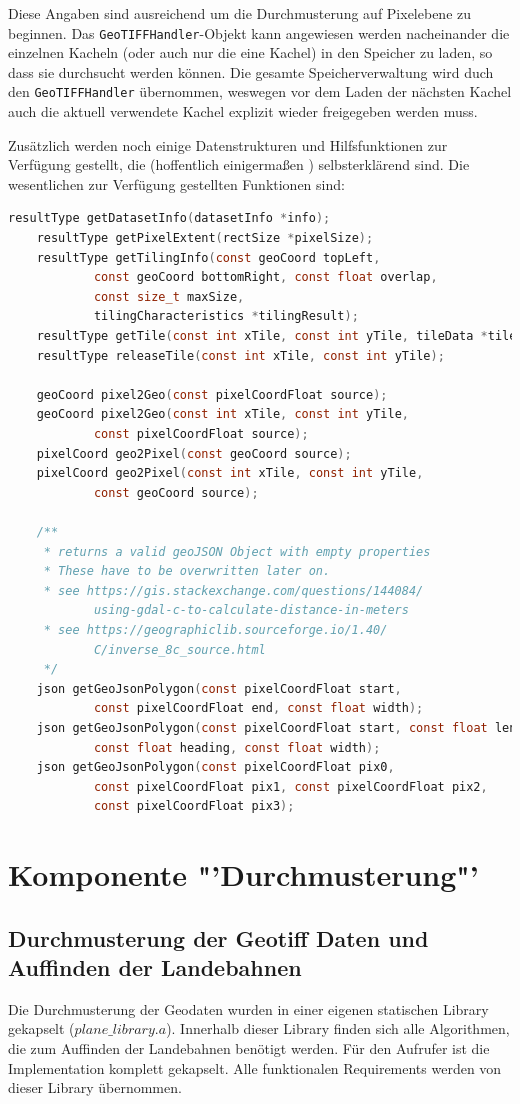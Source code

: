 \documentclass[10pt,a4paper]{report}
\begin{document}
Diese Angaben sind ausreichend um die Durchmusterung auf Pixelebene zu beginnen. Das \texttt{GeoTIFFHandler}-Objekt kann angewiesen werden nacheinander die einzelnen Kacheln (oder auch nur die eine Kachel) in den Speicher zu laden, so dass sie durchsucht werden können. Die gesamte Speicherverwaltung wird duch den \texttt{GeoTIFFHandler} übernommen, weswegen vor dem Laden der nächsten Kachel auch die aktuell verwendete Kachel explizit wieder freigegeben werden muss.

Zusätzlich werden noch einige Datenstrukturen und Hilfsfunktionen zur Verfügung gestellt, die (hoffentlich einigermaßen ) selbsterklärend sind.
Die wesentlichen zur Verfügung gestellten Funktionen sind:
\begin{lstlisting}[language=c]
	resultType getDatasetInfo(datasetInfo *info);
	resultType getPixelExtent(rectSize *pixelSize);
	resultType getTilingInfo(const geoCoord topLeft, 
			const geoCoord bottomRight, const float overlap, 
			const size_t maxSize, 
			tilingCharacteristics *tilingResult);
	resultType getTile(const int xTile, const int yTile, tileData *tile);
	resultType releaseTile(const int xTile, const int yTile);

	geoCoord pixel2Geo(const pixelCoordFloat source);
	geoCoord pixel2Geo(const int xTile, const int yTile, 
			const pixelCoordFloat source);
	pixelCoord geo2Pixel(const geoCoord source);
	pixelCoord geo2Pixel(const int xTile, const int yTile, 
			const geoCoord source);

	/**
	 * returns a valid geoJSON Object with empty properties
	 * These have to be overwritten later on.
	 * see https://gis.stackexchange.com/questions/144084/
	 		using-gdal-c-to-calculate-distance-in-meters
	 * see https://geographiclib.sourceforge.io/1.40/
	 		C/inverse_8c_source.html
	 */
	json getGeoJsonPolygon(const pixelCoordFloat start, 
			const pixelCoordFloat end, const float width);
	json getGeoJsonPolygon(const pixelCoordFloat start, const float length, 
			const float heading, const float width);
	json getGeoJsonPolygon(const pixelCoordFloat pix0, 
			const pixelCoordFloat pix1, const pixelCoordFloat pix2, 
			const pixelCoordFloat pix3);
\end{lstlisting}

\chapter{Komponente "'Durchmusterung"'}
\section{Durchmusterung der Geotiff Daten und Auffinden der Landebahnen}
Die Durchmusterung der Geodaten wurden in einer eigenen statischen Library gekapselt ($plane\_library.a$). Innerhalb dieser Library finden sich alle Algorithmen, die zum Auffinden der Landebahnen benötigt werden. Für den Aufrufer ist die Implementation komplett gekapselt. Alle funktionalen Requirements werden von dieser Library übernommen.
\end{document}
